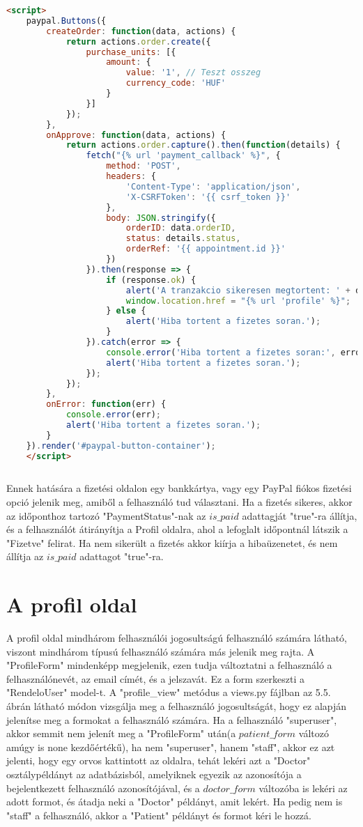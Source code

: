 \begin{lstlisting}[caption={A fizetési logika},label={lst:stringstartswith}, language={HTML}]
	<script>
	paypal.Buttons({
		createOrder: function(data, actions) {
			return actions.order.create({
				purchase_units: [{
					amount: {
						value: '1', // Teszt osszeg
						currency_code: 'HUF'
					}
				}]
			});
		},
		onApprove: function(data, actions) {
			return actions.order.capture().then(function(details) {
				fetch("{% url 'payment_callback' %}", {
					method: 'POST',
					headers: {
						'Content-Type': 'application/json',
						'X-CSRFToken': '{{ csrf_token }}'
					},
					body: JSON.stringify({
						orderID: data.orderID,
						status: details.status,
						orderRef: '{{ appointment.id }}'
					})
				}).then(response => {
					if (response.ok) {
						alert('A tranzakcio sikeresen megtortent: ' + details.payer.name.given_name);
						window.location.href = "{% url 'profile' %}";
					} else {
						alert('Hiba tortent a fizetes soran.');
					}
				}).catch(error => {
					console.error('Hiba tortent a fizetes soran:', error);
					alert('Hiba tortent a fizetes soran.');
				});
			});
		},
		onError: function(err) {
			console.error(err);
			alert('Hiba tortent a fizetes soran.');
		}
	}).render('#paypal-button-container');
	</script>
	
\end{lstlisting}

Ennek hatására a fizetési oldalon egy bankkártya, vagy egy PayPal fiókos fizetési opció jelenik meg, amiből a felhasználó tud választani. Ha a fizetés sikeres, akkor az időponthoz tartozó "PaymentStatus"-nak az $is\_paid$ adattagját "true"-ra állítja, és a felhasználót átirányítja a Profil oldalra, ahol a lefoglalt időpontnál látszik a "Fizetve" felirat. Ha nem sikerült a fizetés akkor kiírja a hibaüzenetet, és nem állítja az $is\_paid$ adattagot "true"-ra.

\section{A profil oldal}

A profil oldal mindhárom felhasználói jogosultságú felhasználó számára látható, viszont mindhárom típusú felhasználó számára más jelenik meg rajta. A "ProfileForm" mindenképp megjelenik, ezen tudja változtatni a felhasználó a felhasználónevét, az email címét, és a jelszavát. Ez a form szerkeszti a "RendeloUser" model-t. A "profile\_view" metódus a views.py fájlban az 5.5. ábrán látható módon vizsgálja meg a felhasználó jogosultságát, hogy ez alapján jelenítse meg a formokat a felhasználó számára. Ha a felhasználó "superuser", akkor semmit nem jelenít meg a "ProfileForm" után(a $patient\_form$ változó amúgy is none kezdőértékű), ha nem "superuser", hanem "staff", akkor ez azt jelenti, hogy egy orvos kattintott az oldalra, tehát lekéri azt a "Doctor" osztálypéldányt az adatbázisból, amelyiknek egyezik az azonosítója a bejelentkezett felhasználó azonosítójával, és a $doctor\_form$ változóba is lekéri az adott formot, és átadja neki a "Doctor" példányt, amit lekért. Ha pedig nem is "staff" a felhasználó, akkor a "Patient" példányt és formot kéri le hozzá.

